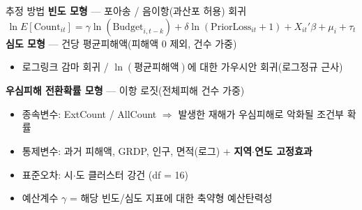 \documentclass[aspectratio=169,10pt]{beamer}
\begin{document}
\begin{frame}{추정 방법}
  \small
  \textbf{빈도 모형} --- 포아송 / 음이항(과산포 허용) 회귀
  \[
    \ln E[\text{Count}_{it}] = \gamma \ln(\text{Budget}_{i,t-k}) + \delta \ln(\text{PriorLoss}_{it}+1) + X_{it}'\beta + \mu_i + \tau_t
  \]
  \textbf{심도 모형} --- 건당 평균피해액(피해액 0 제외, 건수 가중)
  \begin{itemize}
    \item 로그링크 감마 회귀 \quad / \quad $\ln(\text{평균피해액})$에 대한 가우시안 회귀(로그정규 근사)
  \end{itemize}
  \textbf{우심피해 전환확률 모형} --- 이항 로짓(전체피해 건수 가중)
  \begin{itemize}
    \item 종속변수: ExtCount / AllCount $\Rightarrow$ 발생한 재해가 우심피해로 악화될 조건부 확률
  \end{itemize}
  \vspace{4pt}
  \begin{itemize}
    \item 통제변수: 과거 피해액, GRDP, 인구, 면적(로그) + \textbf{지역$\cdot$연도 고정효과}
    \item 표준오차: 시$\cdot$도 클러스터 강건 (df = 16)
    \item 예산계수 $\gamma$ = 해당 빈도/심도 지표에 대한 \alert{축약형 예산탄력성}
  \end{itemize}
\end{frame}
\end{document}

